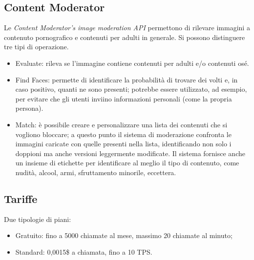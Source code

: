 \subsection{Content Moderator}
Le \textit{Content Moderator’s image moderation API} \cite{microsoft-api-2} permettono di rilevare immagini a contenuto pornografico e contenuti per adulti in generale.
Si possono distinguere tre tipi di operazione.
\begin{itemize}
\item \textsf{Evaluate}: rileva se l'immagine contiene contenuti per adulti e/o contenuti osé.
\item \textsf{Find Faces}: permette di identificare la probabilità di trovare dei volti e, in caso positivo, quanti ne sono presenti; potrebbe essere utilizzato, ad esempio, per evitare che gli utenti inviino informazioni personali (come la propria persona).
\item \textsf{Match}: è possibile creare e personalizzare una lista dei contenuti che si vogliono bloccare; a questo punto il sistema di moderazione confronta le immagini caricate
con quelle presenti nella lista, identificando non solo i doppioni ma anche versioni leggermente modificate.
Il sistema fornisce anche un insieme di etichette per identificare al meglio il tipo di contenuto, come nudità, alcool, armi, sfruttamento minorile, eccettera.  
\end{itemize}
%
%
\subsection{Tariffe} Due tipologie di piani:
\begin{itemize}
\item Gratuito: fino a 5000 chiamate al mese, massimo 20 chiamate al minuto;
\item Standard: 0,0015\$ a chiamata, fino a 10 TPS.
\end{itemize}
%
%